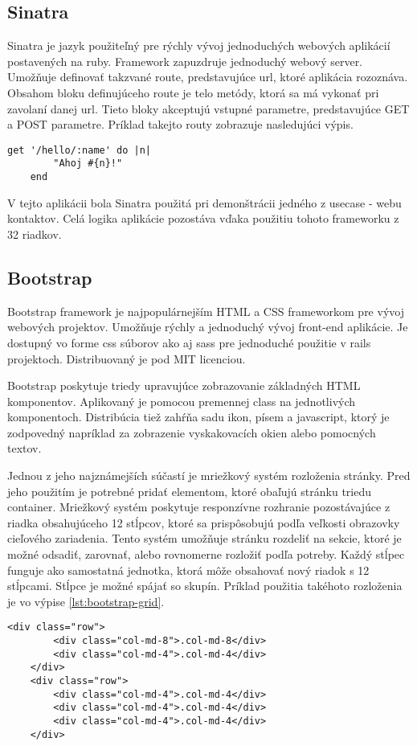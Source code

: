 	\subsection{Sinatra}
	Sinatra je jazyk použiteľný pre rýchly vývoj jednoduchých webových aplikácií postavených na ruby. Framework zapuzdruje jednoduchý webový server. Umožňuje definovať takzvané route, predstavujúce url, ktoré aplikácia rozoznáva. Obsahom bloku definujúceho route je telo metódy, ktorá sa má vykonať pri zavolaní danej url. Tieto bloky akceptujú vstupné parametre, predstavujúce GET a POST parametre. Príklad takejto routy zobrazuje nasledujúci výpis.
	\begin{lstlisting}[label=lst:sinatra-sampel,caption=Príklad definovania GET route vo frameworku Sinatra]
	get '/hello/:name' do |n|
		"Ahoj #{n}!"
	end
	\end{lstlisting}
	V tejto aplikácii bola Sinatra použitá pri demonštrácii jedného z usecase - webu kontaktov. Celá logika aplikácie pozostáva vďaka použitiu tohoto frameworku z 32 riadkov.

	\subsection{Bootstrap}
	Bootstrap framework je najpopulárnejším HTML a CSS frameworkom pre vývoj webových projektov. Umožňuje rýchly a jednoduchý vývoj front-end aplikácie. Je dostupný vo forme css súborov ako aj sass pre jednoduché použitie v rails projektoch. Distribuovaný je pod MIT licenciou.
	
	Bootstrap poskytuje triedy upravujúce zobrazovanie základných HTML komponentov. Aplikovaný je pomocou premennej class na jednotlivých komponentoch. Distribúcia tiež zahŕňa sadu ikon, písem a javascript, ktorý je zodpovedný napríklad za zobrazenie vyskakovacích okien alebo pomocných textov. 
	
	Jednou z jeho najznámejších súčastí je mriežkový systém rozloženia stránky. Pred jeho použitím je potrebné pridať elementom, ktoré obaľujú stránku triedu container.	Mriežkový systém poskytuje responzívne rozhranie pozostávajúce z riadka obsahujúceho 12 stĺpcov, ktoré sa prispôsobujú podľa veľkosti obrazovky cieľového zariadenia. Tento systém umožňuje stránku rozdeliť na sekcie, ktoré je možné odsadiť, zarovnať, alebo rovnomerne rozložiť podľa potreby. Každý stĺpec funguje ako samostatná jednotka, ktorá môže obsahovať nový riadok s 12 stĺpcami. Stĺpce je možné spájať so skupín. Príklad použitia takéhoto rozloženia je vo výpise \ref{lst:bootstrap-grid}.
	\begin{lstlisting}[label=lst:bootstrap-grid,caption=Príklad použitia Bootstrap grid systému]
	<div class="row">
		<div class="col-md-8">.col-md-8</div>
		<div class="col-md-4">.col-md-4</div>
	</div>
	<div class="row">
		<div class="col-md-4">.col-md-4</div>
		<div class="col-md-4">.col-md-4</div>
		<div class="col-md-4">.col-md-4</div>
	</div>
	\end{lstlisting}
	
